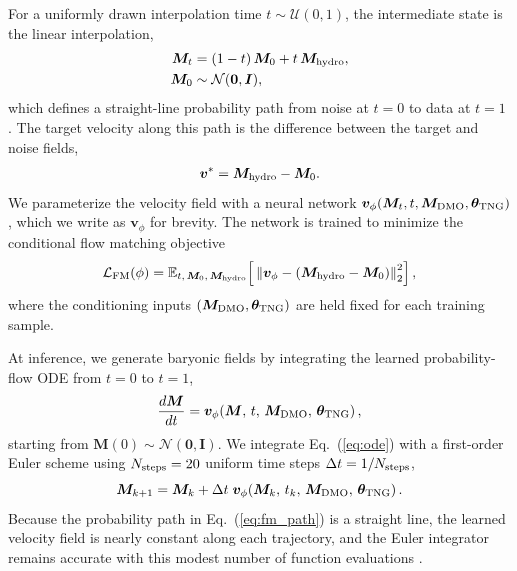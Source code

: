 \documentclass[linenumbers,trackchanges, twocolumn]{aastex701}
\begin{document}
For a uniformly drawn interpolation time $t \sim \mathcal{U}(0,1)$, the intermediate state is the linear interpolation,
\begin{equation}
\begin{split}
    \bm{M}_t &= (1-t)\,\bm{M}_0 + t\,\bm{M}_{\rm hydro}, \\
    \bm{M}_0 &\sim \mathcal{N}(\bm{0},\bm{I}),
\end{split}
    \label{eq:fm_path}
\end{equation}
which defines a straight-line probability path from noise at $t=0$ to data at $t=1$ \citep{lipman2023flowmatching}. The target velocity along this path is the difference between the target and noise fields,
\begin{equation}
    \bm{v}^{\ast} = \bm{M}_{\rm hydro} - \bm{M}_0.
    \label{eq:fm_target}
\end{equation}
We parameterize the velocity field with a neural network $\bm{v}_{\phi}(\bm{M}_t, t, \bm{M}_{\rm DMO}, \boldsymbol{\theta}_{\rm TNG})$, which we write as $\bm{v}_{\phi}$ for brevity. The network is trained to minimize the conditional flow matching objective
\begin{equation}
    \mathcal{L}_{\rm FM}(\phi)
    =
    \mathbb{E}_{t,\,\bm{M}_0,\,\bm{M}_{\rm hydro}}
    \!\left[\,
    \left\|
        \bm{v}_{\phi}
        -
        \left(\bm{M}_{\rm hydro} - \bm{M}_0\right)
    \right\|_2^2
    \right],
    \label{eq:fm_loss}
\end{equation}
where the conditioning inputs $(\bm{M}_{\rm DMO}, \boldsymbol{\theta}_{\rm TNG})$ are held fixed for each training sample.

At inference, we generate baryonic fields by integrating the learned probability-flow ODE from $t=0$ to $t=1$,
\begin{equation}
    \frac{d\bm{M}}{dt}
    =
    \bm{v}_{\phi}\!\left(
        \bm{M},\,t,\,
        \bm{M}_{\rm DMO},\,\boldsymbol{\theta}_{\rm TNG}
    \right),
    \label{eq:ode}
\end{equation}
starting from $\bm{M}(0) \sim \mathcal{N}(\bm{0},\bm{I})$. We integrate Eq.~(\ref{eq:ode}) with a first-order Euler scheme using $N_{\rm steps}=20$ uniform time steps $\Delta t = 1/N_{\rm steps}$,
\begin{equation}
    \bm{M}_{k+1}
    =
    \bm{M}_{k}
    +
    \Delta t\;
    \bm{v}_{\phi}\!\left(
        \bm{M}_k,\,t_k,\,
        \bm{M}_{\rm DMO},\,\boldsymbol{\theta}_{\rm TNG}
    \right).
    \label{eq:euler}
\end{equation}
Because the probability path in Eq.~(\ref{eq:fm_path}) is a straight line, the learned velocity field is nearly constant along each trajectory, and the Euler integrator remains accurate with this modest number of function evaluations \citep{lipman2023flowmatching}.
\end{document}
